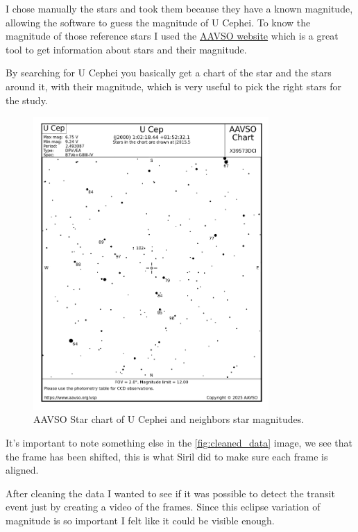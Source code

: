 \documentclass[12pt,a4paper]{article}
\begin{document}
\bigskip

I chose manually the stars and took them because they have a known magnitude, allowing the software to guess the magnitude of U Cephei.
To know the magnitude of those reference stars I used the \href{https://apps.aavso.org/vsp/chart/?star=U+Cep&fov=120.0&maglimit=12.0}{AAVSO website} which is a great tool to get information about stars and their magnitude.

By searching for U Cephei you basically get a chart of the star and the stars around it, with their magnitude, which is very useful to pick the right stars for the study.

\bigskip


\begin{figure}[H]
    \centering
    \includegraphics[width=0.8\textwidth]{assets/ucep-stars-mag.png}
    \caption{AAVSO Star chart of U Cephei and neighbors star magnitudes.}
    \label{fig:Ucep-stars-chart}
\end{figure}

\bigskip

It's important to note something else in the \ref{fig:cleaned_data} image, we see that the frame has been shifted, this is what Siril did to make sure each frame is aligned.

\medskip

After cleaning the data I wanted to see if it was possible to detect the transit event just by creating a video of the frames.
Since this eclipse variation of magnitude is so important I felt like it could be visible enough.
\end{document}
